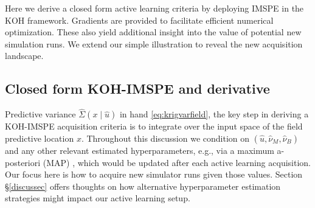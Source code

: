 \documentclass[
]{article}
\begin{document}
Here we derive a closed form active learning criteria by deploying IMSPE in the KOH framework. Gradients are provided to facilitate efficient numerical optimization. These also yield additional insight into the value of potential
new simulation runs. We extend our simple illustration to reveal the new acquisition landscape.

\hypertarget{kohderiv}{%
\subsection{Closed form KOH-IMSPE and derivative}\label{kohderiv}}

Predictive variance \(\hat{\Sigma}(x \mid \hat{u})\) in hand \eqref{eq:krigvarfield}, the key step in deriving a KOH-IMSPE acquisition criteria is to integrate over the input space of the field predictive location \(x\). Throughout this discussion we condition on \((\hat{u}, \hat{\nu}_M, \hat{\nu}_B)\) and any other relevant estimated hyperparameters, e.g., via a maximum a-posteriori (MAP) \citep[e.g.,][\S9.1]{gramacy2020surrogates}, which would be updated after each active learning acquisition. Our focus here is how to acquire new simulator runs given those values. Section \S\ref{discussec} offers thoughts on how alternative hyperparameter estimation strategies might impact our active learning setup.
\end{document}
